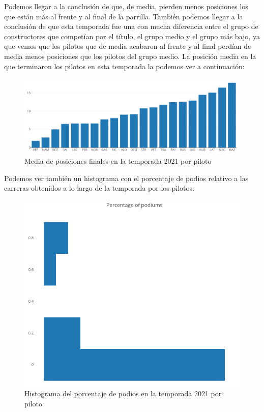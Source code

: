 \documentclass[12pt,twoside,titlepage]{report}
\begin{document}
Podemos llegar a la conclusión de que, de media, pierden menos posiciones los que están más al frente y al final de la parrilla. También podemos llegar a la conclusión de que esta temporada fue una con mucha diferencia entre el grupo de constructores que competían por el título, el grupo medio y el grupo más bajo, ya que vemos que los pilotos que de media acabaron al frente y al final perdían de media menos posiciones que los pilotos del grupo medio. La posición media en la que terminaron los pilotos en esta temporada la podemos ver a continuación:

\begin{figure}[H]
	\includegraphics[scale=0.4]{results/seasonanalysis/avgfinishpos2021.png}
	\centering
	\caption{Media de posiciones finales en la temporada 2021 por piloto}
	\label{fig:avgFinPos2021}
	\centering
\end{figure}

Podemos ver también un histograma con el porcentaje de podios relativo a las carreras obtenidos a lo largo de la temporada por los pilotos:

\begin{figure}[H]
	\includegraphics[scale=0.4]{results/seasonanalysis/percentageofpodiums2021.png}
	\centering
	\caption{Histograma del porcentaje de podios en la temporada 2021 por piloto}
	\label{fig:percPodiums2021}
	\centering
\end{figure}
\end{document}
